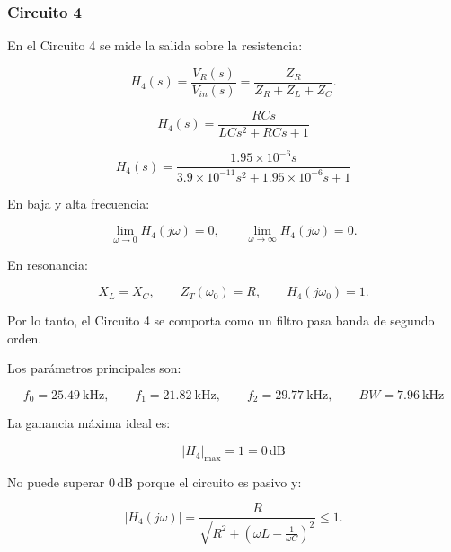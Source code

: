 \subsubsection{Circuito 4}

En el Circuito 4 se mide la salida sobre la resistencia:

\begin{equation}
    H_4(s)=\frac{V_R(s)}{V_{in}(s)}
    =
    \frac{Z_R}{Z_R+Z_L+Z_C}.
\end{equation}

\begin{equation}
    \boxed{
    H_4(s)=
    \frac{RCs}
    {LCs^2+RCs+1}
    }
\end{equation}

\begin{equation}
    \boxed{
    H_4(s)=
    \frac{1.95\times10^{-6}s}
    {3.9\times10^{-11}s^2+1.95\times10^{-6}s+1}
    }
\end{equation}

En baja y alta frecuencia:

\begin{equation}
    \lim_{\omega\to0}H_4(j\omega)=0,
    \qquad
    \lim_{\omega\to\infty}H_4(j\omega)=0.
\end{equation}

En resonancia:

\begin{equation}
    X_L=X_C,
    \qquad
    Z_T(\omega_0)=R,
    \qquad
    H_4(j\omega_0)=1.
\end{equation}

Por lo tanto, el Circuito 4 se comporta como un filtro pasa banda de segundo orden.

Los parámetros principales son:

\begin{equation}
    \boxed{
    f_0=\SI{25.49}{\kilo\hertz},
    \qquad
    f_1=\SI{21.82}{\kilo\hertz},
    \qquad
    f_2=\SI{29.77}{\kilo\hertz},
    \qquad
    BW=\SI{7.96}{\kilo\hertz}
    }
\end{equation}

La ganancia máxima ideal es:

\begin{equation}
    \boxed{
    |H_4|_{\max}=1=0\,\mathrm{dB}
    }
\end{equation}

No puede superar $0\,\mathrm{dB}$ porque el circuito es pasivo y:

\begin{equation}
    |H_4(j\omega)|=
    \frac{R}
    {
    \sqrt{
    R^2+
    \left(\omega L-\frac{1}{\omega C}\right)^2
    }
    }
    \le 1.
\end{equation}

